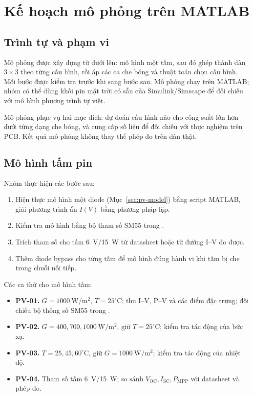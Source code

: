 \section{Kế hoạch mô phỏng trên MATLAB}
\label{sec:simulation}

\subsection{Trình tự và phạm vi}

Mô phỏng được xây dựng từ dưới lên: mô hình một tấm, sau đó ghép thành dàn \(3\times3\) theo từng cấu hình, rồi áp các ca che bóng và thuật toán chọn cấu hình. Mỗi bước được kiểm tra trước khi sang bước sau. Mô phỏng chạy trên MATLAB; nhóm có thể dùng khối pin mặt trời có sẵn của Simulink/Simscape để đối chiếu với mô hình phương trình tự viết.

Mô phỏng phục vụ hai mục đích: dự đoán cấu hình nào cho công suất lớn hơn dưới từng dạng che bóng, và cung cấp số liệu để đối chiếu với thực nghiệm trên PCB. Kết quả mô phỏng không thay thế phép đo trên dàn thật.

\subsection{Mô hình tấm pin}
\label{sec:pv-simulation}

Nhóm thực hiện các bước sau:

\begin{enumerate}
    \item Hiện thực mô hình một diode (Mục~\ref{sec:pv-model}) bằng script MATLAB, giải phương trình ẩn \(I(V)\) bằng phương pháp lặp.
    \item Kiểm tra mô hình bằng bộ tham số SM55 trong \cite{yaqoob}.
    \item Trích tham số cho tấm 6~V/15~W từ datasheet hoặc từ đường I--V đo được.
    \item Thêm diode bypass cho từng tấm để mô hình đúng hành vi khi tấm bị che trong chuỗi nối tiếp.
\end{enumerate}

Các ca thử cho mô hình tấm:

\begin{itemize}
    \item \textbf{PV-01.} \(G=1000\ \mathrm{W/m^2}\), \(T=25^\circ\mathrm{C}\); thu I--V, P--V và các điểm đặc trưng; đối chiếu bộ thông số SM55 trong \cite{yaqoob}.
    \item \textbf{PV-02.} \(G=400,700,1000\ \mathrm{W/m^2}\), giữ \(T=25^\circ\mathrm{C}\); kiểm tra tác động của bức xạ.
    \item \textbf{PV-03.} \(T=25,45,60^\circ\mathrm{C}\), giữ \(G=1000\ \mathrm{W/m^2}\); kiểm tra tác động của nhiệt độ.
    \item \textbf{PV-04.} Tham số tấm 6~V/15~W; so sánh \(V_{\mathrm{OC}}, I_{\mathrm{SC}}, P_{\mathrm{MPP}}\) với datasheet và phép đo.
\end{itemize}

